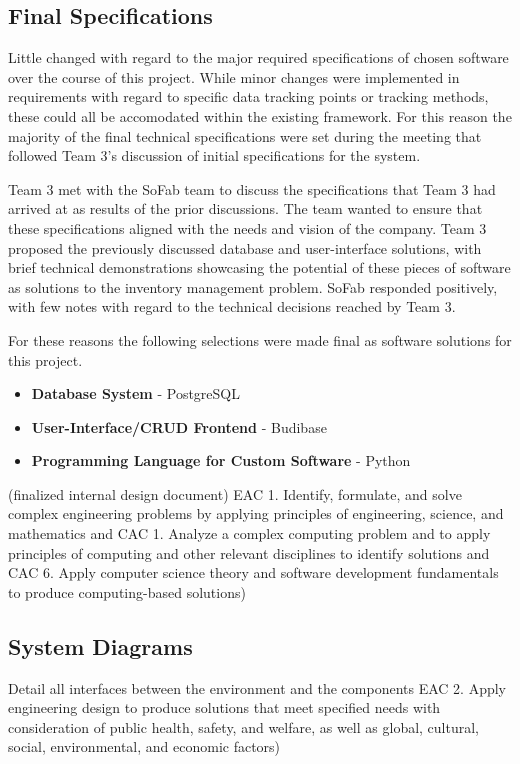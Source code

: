 \documentclass{article}
\begin{document}
\subsection{Final Specifications}
Little changed with regard to the major required specifications of chosen software over the course of this project. While minor changes
were implemented in requirements with regard to specific data tracking points or tracking methods, these could all be accomodated within
the existing framework. For this reason the majority of the final technical specifications were set during the meeting that followed
Team 3's discussion of initial specifications for the system.

Team 3 met with the SoFab team to discuss the specifications that Team 3 had arrived at as results of the prior discussions. The team 
wanted to ensure that these specifications aligned with the needs and vision of the company. Team 3 proposed the previously discussed
database and user-interface solutions, with brief technical demonstrations showcasing the potential of these pieces of software as 
solutions to the inventory management problem. SoFab responded positively, with few notes with regard to the technical decisions reached 
by Team 3. 

For these reasons the following selections were made final as software solutions for this project.

\begin{itemize}
    \item \textbf{Database System} - PostgreSQL
    \item \textbf{User-Interface\slash CRUD Frontend} - Budibase
    \item \textbf{Programming Language for Custom Software} - Python
\end{itemize}
(finalized internal design document) 
    EAC 1. Identify, formulate, and solve complex engineering problems by 
    applying principles of engineering, science, and mathematics and CAC 1. 
    Analyze a complex computing problem and to apply principles of computing 
    and other relevant disciplines to identify solutions and CAC 6. Apply 
    computer science theory and software development fundamentals to produce 
    computing-based solutions) 

\subsection{System Diagrams} 
Detail all interfaces between the environment and the components 
    EAC 2. Apply engineering design to produce solutions that meet specified 
    needs with consideration of public health, safety, and welfare, as well as 
    global, cultural, social, environmental, and economic factors) 
\end{document}
